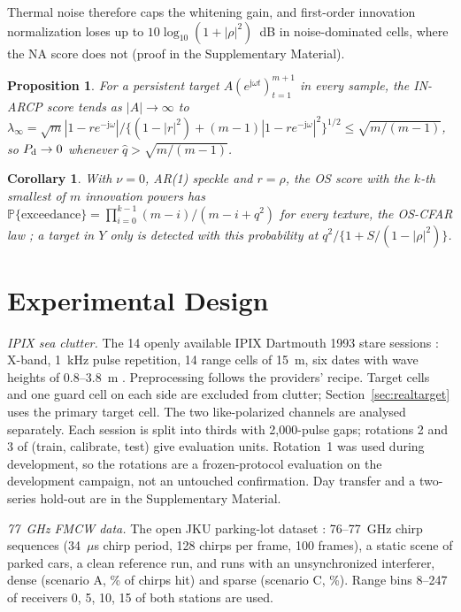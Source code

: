 \documentclass[journal]{IEEEtran}
\newtheorem{proposition}{Proposition}
\newtheorem{corollary}{Corollary}
\newcommand{\PP}{\mathbb{P}}
\begin{document}
Thermal noise therefore caps the whitening gain, and first-order innovation normalization loses up to $10\log_{10}(1+|\rho|^2)$~dB in noise-dominated cells, where the NA score does not (proof in the Supplementary Material).
\begin{proposition}\label{prop:blind}
For a persistent target $A(e^{\mathrm j\omega t})_{t=1}^{m+1}$ in every sample, the IN-ARCP score tends as $|A|\to\infty$ to $\lambda_\infty=\sqrt m|1-re^{-\mathrm j\omega}|/\{(1-|r|^2)+(m-1)|1-re^{-\mathrm j\omega}|^2\}^{1/2}\le\sqrt{m/(m-1)}$, so $P_{\rm d}\to0$ whenever $\widehat q>\sqrt{m/(m-1)}$.
\end{proposition}
\begin{corollary}\label{cor:os}
With $\nu=0$, AR(1) speckle and $r=\rho$, the OS score with the $k$-th smallest of $m$ innovation powers has $\PP\{\text{exceedance}\}=\prod_{i=0}^{k-1}(m-i)/(m-i+q^2)$ for every texture, the OS-CFAR law \cite{rohling1983}; a target in $Y$ only is detected with this probability at $q^2/\{1+S/(1-|\rho|^2)\}$.
\end{corollary}



\section{Experimental Design}\label{sec:design}
\emph{IPIX sea clutter.} The 14 openly available IPIX Dartmouth 1993 stare sessions \cite{ipixweb}: X-band, 1~kHz pulse repetition, 14 range cells of 15~m, six dates with wave heights of 0.8--3.8~m \cite{haykin1995,farina1997}. Preprocessing follows the providers' recipe. Target cells and one guard cell on each side are excluded from clutter; Section~\ref{sec:realtarget} uses the primary target cell. The two like-polarized channels are analysed separately. Each session is split into thirds with 2,000-pulse gaps; rotations 2 and 3 of (train, calibrate, test) give \NUnitsConf{} evaluation units. Rotation~1 was used during development, so the rotations are a frozen-protocol evaluation on the development campaign, not an untouched confirmation. Day transfer and a two-series hold-out are in the Supplementary Material.

\emph{77~GHz FMCW data.} The open JKU parking-lot dataset \cite{jku2026}: 76--77~GHz chirp sequences (34~$\mu$s chirp period, 128 chirps per frame, 100 frames), a static scene of parked cars, a clean reference run, and runs with an unsynchronized interferer, dense (scenario A, \JHitA\% of chirps hit) and sparse (scenario C, \JHitC\%). Range bins 8--247 of receivers 0, 5, 10, 15 of both stations are used.
\end{document}
